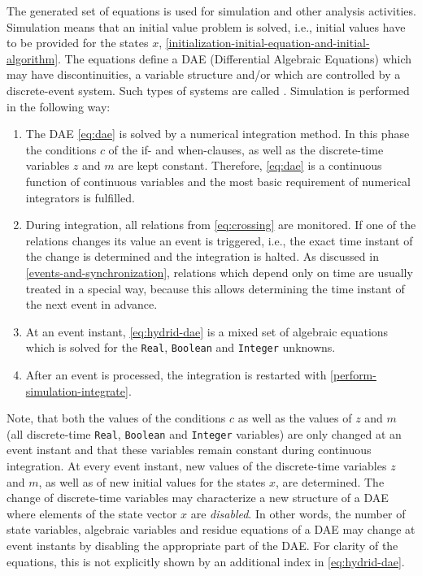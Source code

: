 The generated set of equations is used for simulation and other analysis activities.
Simulation means that an initial value problem is solved, i.e., initial values have to be provided for the states $x$, \cref{initialization-initial-equation-and-initial-algorithm}.
The equations define a DAE (Differential Algebraic Equations) which may have discontinuities, a variable structure and/or which are controlled by a discrete-event system.
Such types of systems are called .
Simulation is performed in the following way:
\begin{enumerate}
\item\label{perform-simulation-integrate}
  The DAE \eqref{eq:dae} is solved by a numerical integration method. In this
  phase the conditions $c$ of the if- and when-clauses, as well as the
  discrete-time variables $z$ and $m$ are kept constant. Therefore, \eqref{eq:dae} is a
  continuous function of continuous variables and the most basic
  requirement of numerical integrators is fulfilled.
\item
  During integration, all relations from \eqref{eq:crossing} are monitored. If one of
  the relations changes its value an event is triggered, i.e., the exact
  time instant of the change is determined and the integration is
  halted. As discussed in \cref{events-and-synchronization}, relations which depend only on
  time are usually treated in a special way, because this allows
  determining the time instant of the next event in advance.
\item
  At an event instant, \eqref{eq:hydrid-dae} is a mixed set of algebraic equations which is solved for the \lstinline!Real!, \lstinline!Boolean! and \lstinline!Integer! unknowns.
\item
  After an event is processed, the integration is restarted with \ref{perform-simulation-integrate}.
\end{enumerate}

Note, that both the values of the conditions $c$ as well as the values of
$z$ and $m$ (all discrete-time \lstinline!Real!, \lstinline!Boolean! and \lstinline!Integer! variables) are only changed at
an event instant and that these variables remain constant during
continuous integration. At every event instant, new values of the
discrete-time variables $z$ and $m$, as well as of new initial values for the states $x$, are
determined. The change of discrete-time variables may characterize a new
structure of a DAE where elements of the state vector $x$ are
\emph{disabled}. In other words, the number of state variables,
algebraic variables and residue equations of a DAE may change at event
instants by disabling the appropriate part of the DAE. For clarity of
the equations, this is not explicitly shown by an additional index in
\eqref{eq:hydrid-dae}.

